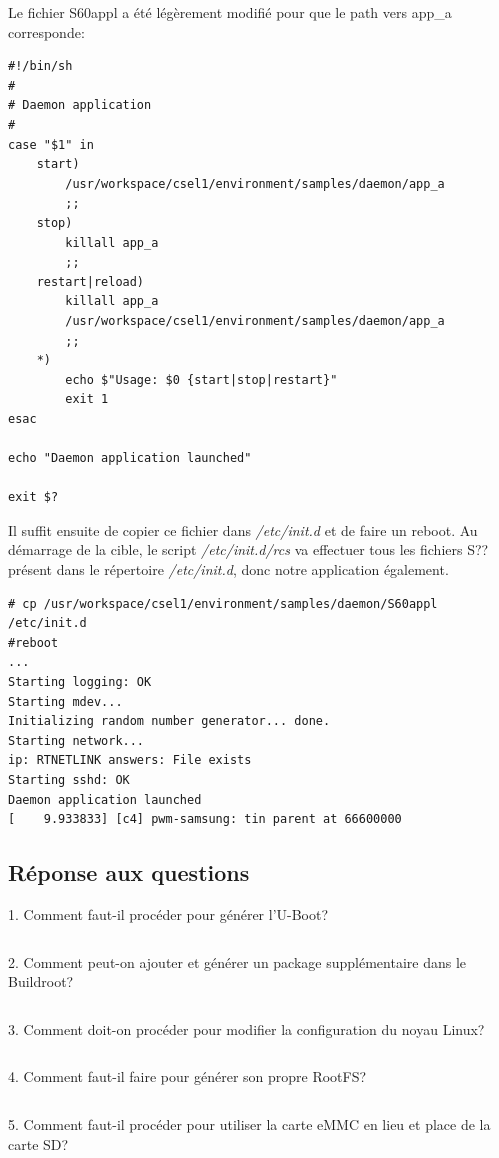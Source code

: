 Le fichier S60appl a été légèrement modifié pour que le path vers app\_a corresponde:
\begin{lstlisting}
#!/bin/sh
#
# Daemon application
#
case "$1" in
	start)
		/usr/workspace/csel1/environment/samples/daemon/app_a
		;;
	stop)
		killall app_a
		;;
	restart|reload)
		killall app_a
		/usr/workspace/csel1/environment/samples/daemon/app_a
		;;
	*)
		echo $"Usage: $0 {start|stop|restart}"
		exit 1
esac

echo "Daemon application launched"

exit $?
\end{lstlisting}
Il suffit ensuite de copier ce fichier dans \textit{/etc/init.d} et de faire un reboot. Au démarrage de la cible, le script \textit{/etc/init.d/rcs} va effectuer tous les fichiers S?? présent dans le répertoire \textit{/etc/init.d}, donc notre application également.
\begin{lstlisting}
# cp /usr/workspace/csel1/environment/samples/daemon/S60appl /etc/init.d
#reboot
...
Starting logging: OK                                                            
Starting mdev...                                                                
Initializing random number generator... done.                                   
Starting network...                                                             
ip: RTNETLINK answers: File exists                                              
Starting sshd: OK                                                               
Daemon application launched                                                     
[    9.933833] [c4] pwm-samsung: tin parent at 66600000  
\end{lstlisting}
\newpage
\color{red}
\subsection{Réponse aux questions}
1. Comment faut-il procéder pour générer l'U-Boot?
\begin{lstlisting}

\end{lstlisting}
2. Comment peut-on ajouter et générer un package supplémentaire dans le Buildroot?
\begin{lstlisting}

\end{lstlisting}
3. Comment doit-on procéder pour modifier la configuration du noyau Linux?
\begin{lstlisting}

\end{lstlisting}
4. Comment faut-il faire pour générer son propre RootFS?
\begin{lstlisting}

\end{lstlisting}
5. Comment faut-il procéder pour utiliser la carte eMMC en lieu et place de la carte SD?
\begin{lstlisting}

\end{lstlisting}
\color{black}

